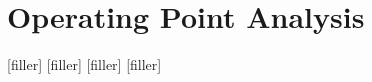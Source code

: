 \section{Operating Point Analysis}
\label{sec:simulation}

[filler]
[filler]
[filler]
[filler]

%    


